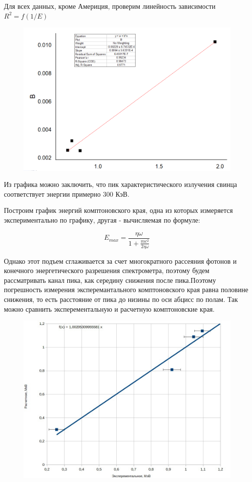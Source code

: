 \documentclass[%
 reprint,
 amsmath,amssymb,
 aps,
]{revtex4-2}
\begin{document}
Для всех данных, кроме Америция, проверим линейность зависимости $R^2 = f(1/E)$

\begin{figure}[h!]
	\includegraphics[scale=0.5]{5.png}
\end{figure}
 Из графика можно заключить, что пик характеристического излучения свинца соответствует энергии примерно $300$ КэВ.
 
 Построим график энергий комптоновского края, одна из которых измеряется экспериментально по графику, другая - вычисляемая по формуле:
 
 \begin{equation}
 E_{max} = \frac{\eta \omega}{1 + \frac{mc^2}{2\eta \omega}}
 \end{equation}
 
 Однако этот подъем сглаживается за счет многократного рассеяния фотонов и конечного энергетического разрешения спектрометра, поэтому будем рассматривать канал пика, как середину снижения после пика.Поэтому погрешность измерения эксперемантального комптоновского края равна половине снижения, то есть расстояние от пика до низины по оси абцисс по полам. Так можно сравнить эксперементальную и расчетную комптоновские края.
 
 \begin{figure}[h!]
 	\includegraphics[scale=0.4]{6.jpg}
 \end{figure}
 
\end{document}
